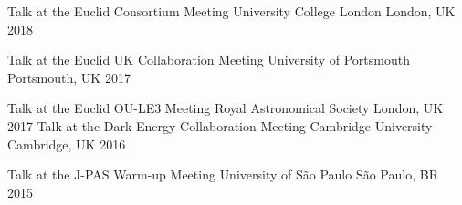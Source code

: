 \begin{cvhonors}
  \cvhonor
    {Talk at the Euclid Consortium Meeting} %
    {University College London} %
    {London, UK} %
    {2018} %


\cvhonor
    {Talk at the Euclid UK Collaboration Meeting} %
    {University of Portsmouth} %
    {Portsmouth, UK} %
    {2017} %

  \cvhonor
    {Talk at the Euclid OU-LE3 Meeting} %
    {Royal Astronomical Society} %
    {London, UK} %
    {2017} %
  \cvhonor
    {Talk at the Dark Energy Collaboration Meeting} %
    {Cambridge University} %
    {Cambridge, UK} %
    {2016} %

  \cvhonor
    {Talk at the J-PAS Warm-up Meeting} %
    {University of São Paulo} %
    {São Paulo, BR} %
    {2015} %

\end{cvhonors}
